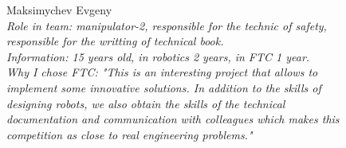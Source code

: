 \begin{figure}[H]
	\begin{minipage}{0.47\linewidth}
		Maksimychev Evgeny\\
		\emph{Role in team: manipulator-2, responsible for the technic of safety, responsible for the writting of technical book. \\}
		\emph{Information: 15 years old, in robotics 2 years, in FTC 1 year. \\}
		\emph{Why I chose FTC: "This is an interesting project that allows to implement some innovative solutions. In addition to the skills of designing robots, we also obtain the skills of the technical documentation and communication with colleagues which makes this competition as close to real engineering problems."}			
	\end{minipage}
	\hfill
	\begin{minipage}{0.47\linewidth}
		\\
	\end{minipage}
	\vfill	
	\begin{minipage}{0.47\linewidth}

\end{minipage}
\end{figure}
